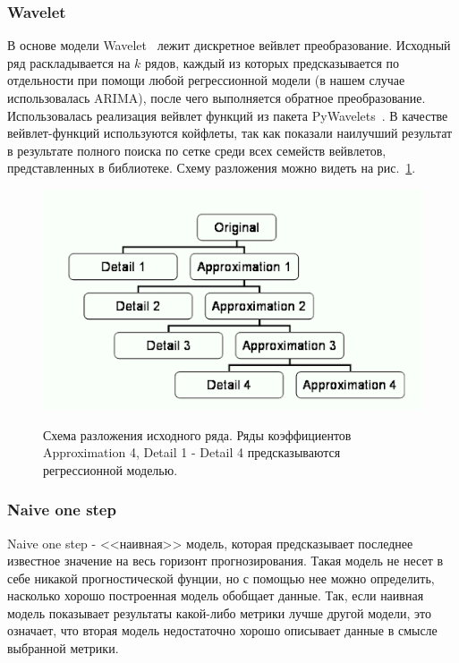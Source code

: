 \documentclass[a4paper,article,14pt]{extarticle}
\begin{document}
\subsubsection{Wavelet}
В основе модели Wavelet~\cite{wavelet} лежит дискретное вейвлет преобразование.
Исходный ряд раскладывается на $k$ рядов, каждый из которых предсказывается по отдельности при помощи любой регрессионной модели (в нашем случае использовалась ARIMA), после чего выполняется обратное преобразование.
Использовалась реализация вейвлет функций из пакета PyWavelets~\cite{pywt}.
В качестве вейвлет-функций используются койфлеты, так как показали наилучший результат в результате полного поиска по сетке среди всех семейств вейвлетов, представленных в библиотеке.
Схему разложения можно видеть на рис.~\ref{fig:wavelet}.

\begin{figure}
    \label{fig:wavelet}
    \begin{center}
        \scalebox{0.6} {
            \includegraphics{images/wavelet}
        }
        \caption{Схема разложения исходного ряда. Ряды коэффициентов Approximation 4, Detail 1 - Detail 4 предсказываются регрессионной моделью.}
    \end{center}
\end{figure}

\subsubsection{Naive one step}
Naive one step - <<наивная>> модель, которая предсказывает последнее известное значение на весь горизонт прогнозирования.
Такая модель не несет в себе никакой прогностической фунции, но с помощью нее можно определить, насколько хорошо построенная модель обобщает данные.
Так, если наивная модель показывает результаты какой-либо метрики лучше другой модели, это означает, что вторая модель недостаточно хорошо описывает данные в смысле выбранной метрики.
\end{document}
